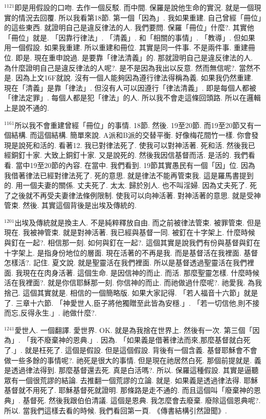 \documentclass{book}
\begin{document}
$^{1121}$即是用假設的口吻.
去作一個反駁.
而中間.
保羅是說他生命的實況.
就是一個現實的情況去回覆.
所以我看第18節.
第一個「因為」.
我如果重建.
自己曾經「冊位」的這些東西.
就證明自己是違反律法的人.
我們要問.
保羅「冊位」什麼?.
其實他「冊位」就是.
「因靠行律法」.
「清義」.
和「相關的事情」.
「教導」.
但如果用一個假設.
如果我重建.
所以重建和冊位.
其實是同一件事.
不是兩件事.
重建冊位.
即是.
現在重申說過.
是要靠「律法清義」的.
那就證明自己是違反律法的人.
為什麼證明自己是違反律法的人呢?.
是不是因為我出以反意.
然而無信呢?.
當然不是.
因為上文16F就說.
沒有一個人能夠因為遵行律法得稱為義.
如果我仍然重建.
現在「清義」是靠「律法」.
但沒有人可以因遵行「律法清義」.
即是每個人都被「律法定罪」.
每個人都是犯「律法」的人.
所以我不會走這條回頭路.
所以在邏輯上是說不通的.

$^{1161}$所以我不會重建曾經「冊位」的事情.
18節.
然後.
19至20節.
而19至20節又有一個結構.
而這個結構.
簡單來說.
A派和B派的交替平衡.
好像梅花間竹一樣.
你會發現是說死和活的.
看著12.
我已對律法死了.
使我可以對神活著.
死和活.
然後我已經銅釘十家.
大致上銅釘十家.
又是說死的.
然後我因信基督而活.
是活的.
我們看看.
當中19至20節的內容.
在當中.
我們看到.
19節其實愚民有一個「因」位.
因為我借著律法已經對律法死了.
死的意思.
就是律法不能再管束我.
這是羅馬書提到的.
用一個夫妻的關係.
丈夫死了.
太太.
歸於別人.
也不叫淫婦.
因為丈夫死了.
死了之後就不再受夫妻律法條例限制.
使我可以向神活著.
對神活著的意思.
就是受神管束.
然後.
其實這個背後是出埃及傳統的.

$^{1201}$出埃及傳統就是換主人.
不是純粹釋放自由.
而之前被律法管束.
被罪管束.
但是現在.
我被神管束.
就是對神活著.
我已經與基督一同.
被釘在十字架上.
什麼時候與釘在一起?.
相信那一刻.
如何與釘在一起?.
這個其實是說我們有份與基督與釘在十字架上.
是指身份地位的層面.
現在活著的不再是我.
而是基督活在我裡面.
基督怎樣活?.
記住.
夏文說.
就是聖靈活在我們裡面.
所以是基督透過聖靈活在我們裡面.
我現在在肉身活著.
這個生命.
是因信神的而止.
而活.
那麼聖靈怎樣.
什麼時候活在我裡面?.
就是你信耶穌那一刻.
你信神的而止.
而祂做過什麼呢?.
祂愛我.
為我捨己.
這個其實就是.
相信的一個簡略版.
如果大家記得.
「若人福音十六節」就是了.
三章十六節.
「神愛世人,臣子將他獨贈至此皆為安穩.」.
「若一切信他,則不接而忘,反得永生.」.
祂做什麼?.

$^{1241}$愛世人.
一個翻譯.
愛世界.
OK.
就是為我捨在世界上.
然後有一次.
第三個「因為」.
「我不廢棄神的恩典.」.
因為.
「如果義是借著律法而來,那麼基督就白死了.」.
就是枉死了.
這個是假設.
但是這個假設.
背後有一個含義.
基督耶穌會不會做一些多餘的事情呢?.
祂死是很大的事情.
但是現在祂居然白死.
那個前提就是.
義是透過律法得到.
那麼基督還去死.
真是白活嗎?.
所以.
保羅這種假設.
其實是逼聽眾有一個很荒謬的結論.
去推翻一個荒謬的立論.
就是.
如果義是透過律法得.
耶穌基督就不用死了.
耶穌基督死就證明.
那條路是走不通的.
而且這個叫「廢棄神的恩典」.
基督死.
然後我跟伯伯清議.
這個是恩典.
我怎麼會去廢棄.
廢除這個恩典呢?.
所以.
當我們這樣去看的時候.
我們看回第一頁.
《傳書結構引然證聞》.
\end{document}
